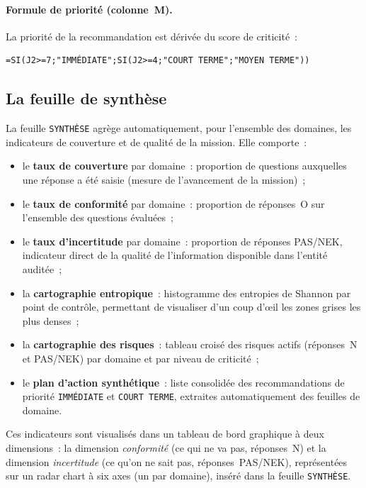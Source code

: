 \paragraph{Formule de priorité (colonne~M).}
La priorité de la recommandation est dérivée du score de criticité~:

\begin{verbatim}
=SI(J2>=7;"IMMÉDIATE";SI(J2>=4;"COURT TERME";"MOYEN TERME"))
\end{verbatim}

\subsection{La feuille de synthèse}

La feuille \texttt{SYNTHÈSE} agrège automatiquement, pour l'ensemble des
domaines, les indicateurs de couverture et de qualité de la mission. Elle
comporte~:

\begin{itemize}
  \item le \textbf{taux de couverture} par domaine~: proportion de questions
        auxquelles une réponse a été saisie (mesure de l'avancement de la
        mission)~;
  \item le \textbf{taux de conformité} par domaine~: proportion de réponses~O
        sur l'ensemble des questions évaluées~;
  \item le \textbf{taux d'incertitude} par domaine~: proportion de réponses
        PAS/NEK, indicateur direct de la qualité de l'information disponible
        dans l'entité auditée~;
  \item la \textbf{cartographie entropique}~: histogramme des entropies de
        Shannon par point de contrôle, permettant de visualiser d'un coup d'œil
        les zones grises les plus denses~;
  \item la \textbf{cartographie des risques}~: tableau croisé des risques
        actifs (réponses~N et PAS/NEK) par domaine et par niveau de criticité~;
  \item le \textbf{plan d'action synthétique}~: liste consolidée des
        recommandations de priorité \texttt{IMMÉDIATE} et \texttt{COURT TERME},
        extraites automatiquement des feuilles de domaine.
\end{itemize}

Ces indicateurs sont visualisés dans un tableau de bord graphique à deux
dimensions~: la dimension \emph{conformité} (ce qui ne va pas, réponses~N)
et la dimension \emph{incertitude} (ce qu'on ne sait pas, réponses~PAS/NEK),
représentées sur un radar chart à six axes (un par domaine), inséré dans la
feuille \texttt{SYNTHÈSE}.

